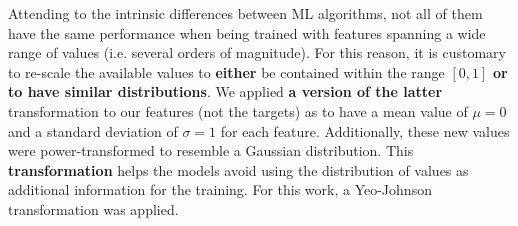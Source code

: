 \documentclass{aa}
\begin{document}
\begin{table}
\setlength{\tabcolsep}{3pt}
\caption{Composition of initial catalogue and number of cross matches with additional surveys and catalogues.}             %
\label{table:composition_catalogue}      %
\centering                          %
\end{table}

Attending to the intrinsic differences between ML algorithms, not all of them have the same performance when being trained with features spanning a wide range of values (i.e. several orders of magnitude). For this reason, it is customary to re-scale the available values to \textbf{either} be contained within the range $[0, 1]$ \textbf{or to have similar distributions}. We applied \textbf{a version of the latter} transformation to our features (not the targets) as to have a mean value of $\mu = 0$ and a standard deviation of $\sigma = 1$ for each feature. Additionally, these new values were power-transformed to resemble a Gaussian distribution. This \textbf{transformation} helps the models avoid using the distribution of values as additional information for the training. For this work, a Yeo-Johnson transformation \citep{10.1093/biomet/87.4.954} was applied.
\end{document}
